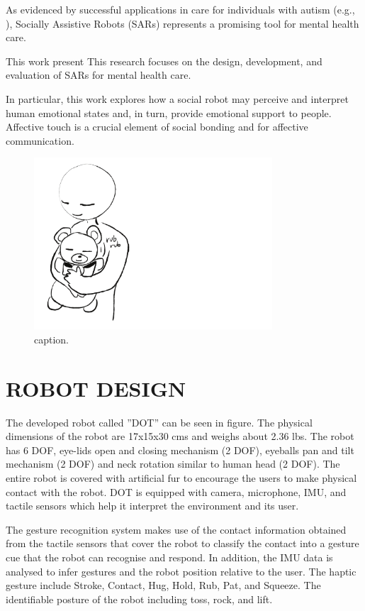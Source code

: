 \documentclass[letterpaper, 10 pt, conference]{ieeeconf}  %
\begin{document}
As evidenced by successful applications in care for individuals with autism (e.g., \cite{scassellati2018improving}), Socially Assistive Robots (SARs) \cite{} represents a promising tool for mental health care. 

This work present
This research focuses on the design, development, and evaluation of SARs for mental health care.

In particular, this work explores how a social robot may perceive and interpret human emotional states and, in turn, provide emotional support to people. Affective touch is a crucial element of social bonding and for affective communication. 


\begin{figure}[t!]
\centering
\includegraphics[width=3.5in]{teaser.pdf}
\vskip -10pt
\caption{caption.}
\label{fig:teaser}
\end{figure}

\section{ROBOT DESIGN}

The developed robot called ''DOT'' can be seen in figure. The physical dimensions of the robot are 17x15x30 cms and weighs about 2.36 lbs. The robot has 6 DOF, eye-lids open and closing mechanism (2 DOF), eyeballs pan and tilt mechanism (2 DOF) and neck rotation similar to human head (2 DOF). The entire robot is covered with artificial fur to encourage the users to make physical contact with the robot. DOT is equipped with camera, microphone, IMU, and tactile sensors which help it interpret the environment and its user.  

The gesture recognition system makes use of the contact information obtained from the tactile sensors that cover the robot to classify the contact into a gesture cue that the robot can recognise and respond. In addition, the IMU data is analysed to infer gestures and the robot position relative to the user. The haptic gesture include Stroke, Contact, Hug, Hold, Rub, Pat, and Squeeze. The identifiable posture of the robot including toss, rock, and lift.  
\end{document}

